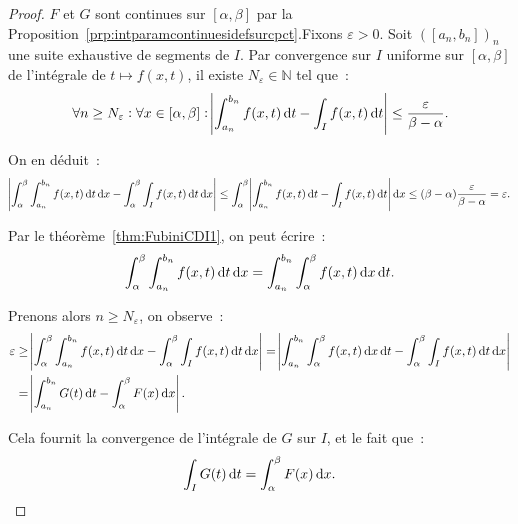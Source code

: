 \documentclass{report}
\theoremstyle{definition}
\theoremstyle{remark}
\numberwithin{equation}{section}
\newcommand{\N}{\mathbb N}
\begin{document}
			\begin{proof} $F$ et $G$ sont continues sur $[\alpha, \beta]$ par la Proposition~\ref{prp:intparamcontinuesidefsurcpct}.Fixons $\varepsilon > 0$.
			Soit $([a_n, b_n])_n$ une suite exhaustive de segments de $I$. Par convergence sur $I$ uniforme sur $[\alpha, \beta]$ de l'intégrale de
			$t \mapsto f(x, t)$, il existe $N_\varepsilon \in \N$ tel que~:
			\begin{equation}
				\forall n \geq N_\varepsilon : \forall x \in [\alpha, \beta] : \abs {\int_{a_n}^{b_n} f(x, t)\dif t - \int_I f(x, t)\dif t}
				\leq \frac \varepsilon{\beta-\alpha}.
			\end{equation}

			On en déduit~:
			\begin{equation}
				\abs {\int_\alpha^\beta\int_{a_n}^{b_n} f(x, t)\dif t\dif x - \int_\alpha^\beta\int_I f(x, t)\dif t\dif x}
				\leq \int_\alpha^\beta\abs {\int_{a_n}^{b_n}f(x, t)\dif t - \int_I f(x, t)\dif t}\dif x
				\leq (\beta-\alpha)\frac \varepsilon{\beta-\alpha} = \varepsilon.
			\end{equation}

			Par le théorème~\ref{thm:FubiniCDI1}, on peut écrire~:
			\begin{equation}
				\int_\alpha^\beta\int_{a_n}^{b_n}f(x, t)\dif t\dif x = \int_{a_n}^{b_n}\int_\alpha^\beta f(x, t)\dif x\dif t.
			\end{equation}

			Prenons alors $n \geq N_\varepsilon$, on observe~:
			\begin{align}
				\varepsilon &\geq \abs {\int_\alpha^\beta\int_{a_n}^{b_n} f(x, t)\dif t\dif x - \int_\alpha^\beta\int_I f(x, t)\dif t\dif x}
				= \abs {\int_{a_n}^{b_n}\int_\alpha^\beta f(x, t)\dif x\dif t - \int_\alpha^\beta\int_I f(x, t)\dif t\dif x} \\
				&= \abs {\int_{a_n}^{b_n}G(t)\dif t - \int_\alpha^\beta F(x)\dif x}.
			\end{align}

			Cela fournit la convergence de l'intégrale de $G$ sur $I$, et le fait que~:
			\begin{equation}
				\int_I G(t)\dif t = \int_\alpha^\beta F(x)\dif x.
			\end{equation}
			\end{proof}
\end{document}

